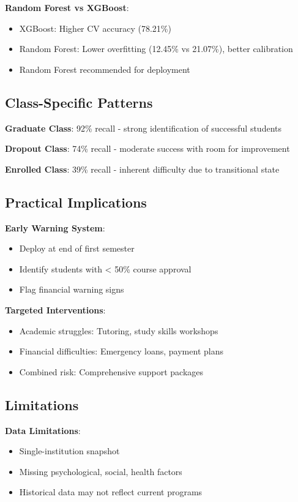 \textbf{Random Forest vs XGBoost}:
\begin{itemize}
    \item XGBoost: Higher CV accuracy (78.21\%)
    \item Random Forest: Lower overfitting (12.45\% vs 21.07\%), better calibration
    \item Random Forest recommended for deployment
\end{itemize}

\subsection{Class-Specific Patterns}

\textbf{Graduate Class}: 92\% recall - strong identification of successful students

\textbf{Dropout Class}: 74\% recall - moderate success with room for improvement

\textbf{Enrolled Class}: 39\% recall - inherent difficulty due to transitional state

\subsection{Practical Implications}

\textbf{Early Warning System}:
\begin{itemize}
    \item Deploy at end of first semester
    \item Identify students with < 50\% course approval
    \item Flag financial warning signs
\end{itemize}

\textbf{Targeted Interventions}:
\begin{itemize}
    \item Academic struggles: Tutoring, study skills workshops
    \item Financial difficulties: Emergency loans, payment plans
    \item Combined risk: Comprehensive support packages
\end{itemize}

\subsection{Limitations}

\textbf{Data Limitations}:
\begin{itemize}
    \item Single-institution snapshot
    \item Missing psychological, social, health factors
    \item Historical data may not reflect current programs
\end{itemize}

